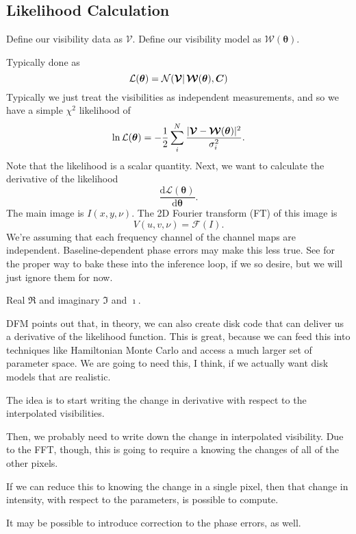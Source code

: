 \documentclass[modern]{aastex62}
\newcommand{\vd}{\boldsymbol{\mathcal{V}}} %
\newcommand{\vm}{\boldsymbol{\mathcal{W}}} %
\newcommand{\btheta}{\boldsymbol{\theta}} %
\begin{document}
\subsection{Likelihood Calculation}

Define our visibility data as $\boldsymbol{\mathcal{V}}$.
Define our visibility model as $\boldsymbol{\mathcal{W}}(\boldsymbol{\theta})$.

Typically done as 
\begin{equation}
    {\cal L}(\boldsymbol{\theta}) = {\cal N}(\boldsymbol{\mathcal{V}} |\, \boldsymbol{\mathcal{W}}(\boldsymbol{\theta}), \boldsymbol{C})
\end{equation}
Typically we just treat the visibilities as independent measurements, and so we have a simple $\chi^2$ likelihood of 
\begin{equation}
    \ln {\cal L}(\btheta) = - \frac{1}{2} \sum_i^N \frac{|\vd - \vm(\btheta)|^2}{\sigma_i^2}.
\end{equation}
Note that the likelihood is a scalar quantity. Next, we want to calculate the derivative of the likelihood
\begin{equation}
    \frac{\mathrm{d}\mathcal{L}(\btheta)}{\mathrm{d}\btheta}.
\end{equation}
The main image is $I(x,y,\nu)$. The 2D Fourier transform (FT) of this image is 
\begin{equation}
    V(u,v,\nu) = \mathcal{F}(I).
\end{equation}
We're assuming that each frequency channel of the channel maps are independent. Baseline-dependent phase errors may make this less true. See \citet{hezaveh13} for the proper way to bake these into the inference loop, if we so desire, but we will just ignore them for now.

Real $\Re$ and imaginary $\Im$ and $\imath$.

DFM points out that, in theory, we can also create disk code that can deliver us a derivative of the likelihood function. This is great, because we can feed this into techniques like Hamiltonian Monte Carlo and access a much larger set of parameter space. We are going to need this, I think, if we actually want disk models that are realistic.

The idea is to start writing the change in derivative with respect to the interpolated visibilities.

Then, we probably need to write down the change in interpolated visibility. Due to the FFT, though, this is going to require a knowing the changes of all of the other pixels. 

If we can reduce this to knowing the change in a single pixel, then that change in intensity, with respect to the parameters, is possible to compute.

It may be possible to introduce correction to the phase errors, as well.


\acknowledgments




\end{document}

